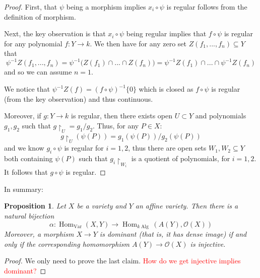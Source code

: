 \documentclass[12pt]{article}
\theoremstyle{plain}
\newtheorem{proposition}[thm]{Proposition}
\theoremstyle{definition}
\newcommand{\call}[1]{\mathcal{#1}}
\newcommand{\lto}{\longrightarrow}
\begin{document}
\begin{proof}
First, that $\psi$ being a morphism implies $x_i \circ \psi$ is regular follows from the definition of morphism.

Next, the key observation is that $x_i \circ \psi$ being regular implies that $f \circ \psi$ is regular for any polynomial $f: Y \lto k$. We then have for any zero set $Z(f_1,...,f_n) \subseteq Y$ that
\begin{equation}
\psi^{-1}Z(f_1,...,f_n) = \psi^{-1}\big(Z(f_1)\cap...\cap Z(f_n)\big) = \psi^{-1}Z(f_1)\cap ... \cap \psi^{-1}Z(f_n)
\end{equation}
and so we can assume $n = 1$.

We notice that $\psi^{-1}Z(f) = (f\circ \psi)^{-1}\lbrace 0 \rbrace$ which is closed as $f\circ\psi$ is regular (from the key observation) and thus continuous.

Moreover, if $g: Y \lto k$ is regular, then there exists open $U \subset Y$ and polynomials $g_1,g_2$ such that $g\restriction_{U} = g_1/g_2$. Thus, for any $P \in X$:
\begin{equation}
g\restriction_{U}(\psi(P)) = g_1(\psi(P))/g_2(\psi(P))
\end{equation}
and we know $g_i \circ \psi$ is regular for $i = 1,2$, thus there are open sets $W_1,W_2 \subseteq Y$ both containing $\psi(P)$ such that $g_i\restriction_{W_i}$ is a quotient of polynomials, for $i = 1,2$. It follows that $g \circ \psi$ is regular.
\end{proof}



In summary:
\begin{proposition}
\label{prop:adjunction}
Let $X$ be a variety and $Y$ an affine variety. Then there is a natural bijection
\[\alpha: \operatorname{Hom}_{\operatorname{Var}}(X,Y) \lto \operatorname{Hom}_{k\operatorname{Alg}}(A(Y),\call{O}(X))\]
Moreover, a morphism $X \lto Y$ is \emph{dominant} (that is, it has dense image) if and only if the corresponding homomorphism $A(Y) \lto \call{O}(X)$ is injective.
\end{proposition}
\begin{proof}
We only need to prove the last claim. \textcolor{red}{How do we get injective implies dominant?}
\end{proof}
%
%
%
%
%
\end{document}
